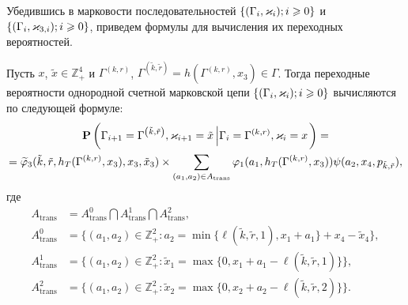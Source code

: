 \documentclass[a4paper,12pt,russian]{extarticle}
\newcommand{\G}{\Gamma}
\newcommand{\Mark}{\{(\G_i, \vk_i); i \geqslant 0\}}
\newcommand{\MarkThree}{\{(\G_i, \vk_{3,i}); i \geqslant 0\}}
\newcommand{\ga}[1]{\Gamma^{\left( #1 \right)} }
\renewcommand{\Pr}{{\mathbf P}}
\renewcommand{\P}[2]{\Pr\left( #1 \left| #2\right.\right)}
\begin{document}
Убедившись в марковости последовательностей $\Mark$ и $\MarkThree$, приведем формулы для вычисления их переходных вероятностей. 
\begin{theorem}
Пусть $x$, $\tilde{x}\in \mathbb{Z}_+^4$ и $\ga{k,r}$, $\ga{\tilde{k},\tilde{r}}=h(\ga{k,r},x_3) \in \G$. Тогда переходные вероятности однородной счетной марковской цепи $\Mark$ вычисляются по следующей формуле:
\begin{multline}
\P{\G_{i+1}=\ga{\tilde{k},\tilde{r}},\vk_{i+1}=\tilde{x}}{\G_{i}=\ga{k,r},\vk_i=x}=\\ 
=\widetilde{\vp}_3(\tilde{k},\tilde{r},h_T(\ga{{k},{r}},x_3),x_3,\tilde{x}_3)\times
\sum_{(a_1,a_2)\in A_{\mathrm{trans}}}\vp_1(a_1,h_T(\ga{{k},{r}},x_3))  \psi(a_2,x_4, p_{\tilde{k},\tilde{r}}),
\label{transitionToProve}
\end{multline}
где 
\begin{align*}
A_{\mathrm{trans}} &= A_{\mathrm{trans}}^0 \bigcap A_{\mathrm{trans}}^1\bigcap A_{\mathrm{trans}}^2,\\
A_{\mathrm{trans}}^0 &= \{(a_1,a_2) \in \mathbb{Z}_+^2 \colon a_2 = \min{\{\ell(\tilde{k},\tilde{r},1), x_1+a_1}\} +x_4-\tilde{x}_4\},\\
A_{\mathrm{trans}}^1 &= \{(a_1,a_2) \in \mathbb{Z}_+^2 \colon \tilde{x}_1=\max{\{0,x_1+a_1-\ell(\tilde{k},\tilde{r},1)\}}\},\\
A_{\mathrm{trans}}^2 &= \{(a_1,a_2) \in \mathbb{Z}_+^2 \colon  \tilde{x}_2=\max{\{0,x_2+a_2-\ell(\tilde{k},\tilde{r},2)\}}\}.
\end{align*}
\end{theorem}
\end{document}
